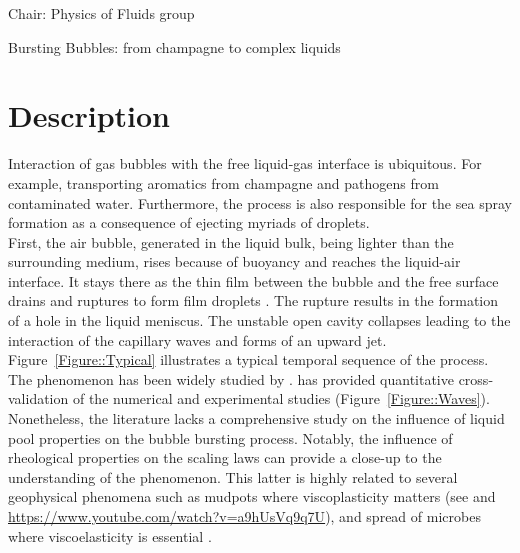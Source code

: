 \documentclass[a4paper,10pt]{article}
\begin{document}
\noindent Chair: Physics of Fluids group
\begin{center}
 \begin{LARGE}
  Bursting Bubbles: from champagne to complex liquids
 \end{LARGE}
\end{center}
\section*{Description}
Interaction of gas bubbles with the free liquid-gas interface is ubiquitous. For example, transporting aromatics from champagne and pathogens from contaminated water. Furthermore, the process is also responsible for the sea spray formation as a consequence of ejecting myriads of droplets.\\
First, the air bubble, generated in the liquid bulk, being lighter than the surrounding medium, rises because of buoyancy and reaches the liquid-air interface. It stays there as the thin film between the bubble and the free surface drains and ruptures to form film droplets \citep{lhuissier2012bursting}. The rupture results in the formation of a hole in the liquid meniscus. The unstable open cavity collapses leading to the interaction of the capillary waves and forms of an upward jet.
Figure~\ref{Figure::Typical} illustrates a typical temporal sequence of the process. The phenomenon has been widely studied by \cite{duchemin2002jet, walls2015jet, deike2018dynamics, gordillo2019capillary}.
\cite{deike2018dynamics} has provided quantitative cross-validation of the numerical and experimental studies (Figure~\ref{Figure::Waves}). Nonetheless, the literature lacks a comprehensive study on the influence of liquid pool properties on the bubble bursting process. Notably, the influence of rheological properties on the scaling laws can provide a close-up to the understanding of the phenomenon. This latter is highly related to several geophysical phenomena such as mudpots where viscoplasticity matters (see \citet{sanjay_lohse_jalaal_2021} and \href{https://www.youtube.com/watch?v=a9hUsVq9q7U}{https://www.youtube.com/watch?v=a9hUsVq9q7U}), and spread of microbes where viscoelasticity is essential \citet{walls2017quantifying, bourouiba2021fluid}.
\end{document}
